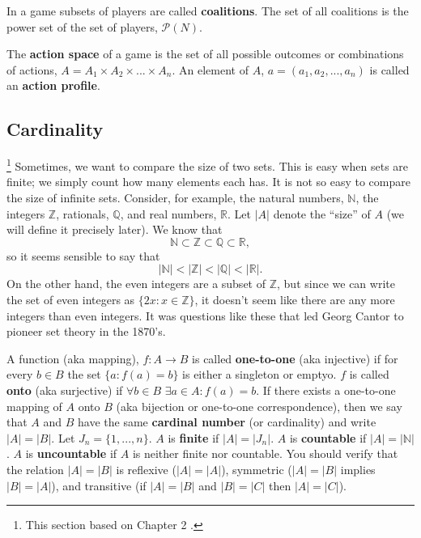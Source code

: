 \begin{example} 
  In a game subsets of players are called \textbf{coalitions}. The set
  of all coalitions is the power set of the set of players,
  $\mathcal{P}(N)$. 

  The \textbf{action space} of a game is the set of all possible
  outcomes or combinations of actions, $A = A_1 \times A_2 \times
  ... \times A_n$. An element of $A$, $a = (a_1, a_2, ..., a_n)$ is
  called an \textbf{action profile}. 
\end{example}

\subsection{Cardinality \label{s:card}}

\footnote{This section based on Chapter 2 \citet{rudin1976}.} 
Sometimes, we want to compare the size of two
sets. This is easy when sets are finite; we simply count how many
elements each has. It is not so easy to compare the size of infinite
sets. Consider, for example, the natural numbers, $\mathbb{N}$, the
integers $\mathbb{Z}$, rationals, $\mathbb{Q}$, and real numbers,
$\mathbb{R}$. Let $|A|$ denote the ``size'' of $A$ (we will define it
precisely later). We know that
\[ \mathbb{N} \subset \mathbb{Z} \subset \mathbb{Q} \subset
\mathbb{R}, \]
so it seems sensible to say that 
\[ |\mathbb{N}| < |\mathbb{Z}| < |\mathbb{Q}| < |\mathbb{R}|. \] 
On the other hand, the even integers are a subset of $\mathbb{Z}$, but
since we can write the set of even integers as $\{2x: x \in \mathbb{Z}
\}$, it doesn't seem like there are any more integers than even
integers. It was questions like these that led Georg Cantor to pioneer
set theory in the 1870's. 

A function (aka mapping), $f:A \rightarrow B$ is called
\textbf{one-to-one} (aka injective) if for every $b \in B$ the set
$\{a: f(a) = b \}$ is either a singleton or emptyo. $f$ is called
\textbf{onto} (aka surjective) if $\forall b \in B$ $\exists a \in A:
f(a) = b$.  If there exists a one-to-one mapping of $A$ onto $B$ (aka
bijection or one-to-one correspondence), then we say that $A$ and $B$
have the same \textbf{cardinal number} (or cardinality) and write $|A|
= |B|$.  Let $J_n = \{1, ..., n \}$. $A$ is \textbf{finite} if $|A| =
|J_n|$.  $A$ is \textbf{countable} if $|A| = |\mathbb{N}|$. $A$ is
\textbf{uncountable} if $A$ is neither finite nor countable.  You
should verify that the relation $|A| = |B|$ is reflexive ($|A| =
|A|$), symmetric ($|A| = |B|$ implies $|B| = |A|$), and transitive (if
$|A| = |B|$ and $|B| = |C|$ then $|A| = |C|$). 

